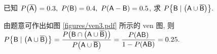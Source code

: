 \begin{example}
    已知 $P\qty(\overline{\mathsf{A}})=0.3,~P(\mathsf{B})=0.4,~P(\mathsf{A}-\mathsf{B})=0.5$, 求 $P\qty{\mathsf{B}\mid \qty(\mathsf{A}\cup\overline{\mathsf{B}})}.$
\end{example}
\begin{solution}
    由题意可作出如图 \ref{figures/ven3.pdf} 所示的 ven 图, 则 $P\qty{\mathsf{B}\mid \qty(\mathsf{A}\cup\overline{\mathsf{B}})}=\dfrac{P\qty(\mathsf{B}\cap\qty(\mathsf{A}\cup\overline{\mathsf{B}}))}{P\qty(\mathsf{A}\cup\overline{\mathsf{B}})}=\dfrac{P(\mathsf{AB})}{1-P(\mathsf{AB})}=0.25.$
\end{solution}

% 


